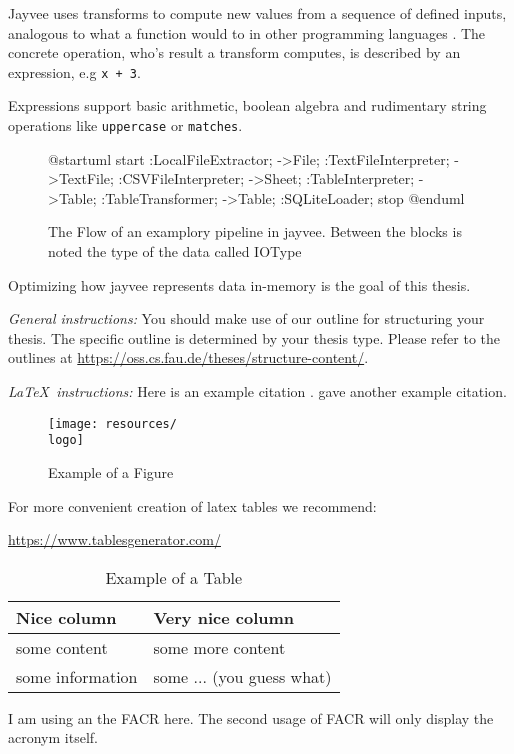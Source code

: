 Jayvee uses transforms to compute new values from a sequence of defined inputs, analogous to what a function would to in other programming languages \autocite{jvalue:jayvee:docs:transfrom}.
The concrete operation, who's result a transform computes, is described by an expression, e.g \Verb|x + 3|.

Expressions support basic arithmetic, boolean algebra and rudimentary string operations like \Verb|uppercase| or \Verb|matches|.

\begin{figure}
	\begin{plantuml}
		@startuml
		start
		:LocalFileExtractor;
		->File;
		:TextFileInterpreter;
		->TextFile;
		:CSVFileInterpreter;
		->Sheet;
		:TableInterpreter;
		->Table;
		:TableTransformer;
		->Table;
		:SQLiteLoader;
		stop
		@enduml
	\end{plantuml}
	\caption{The Flow of an examplory pipeline in jayvee. Between the blocks is noted the type of the data called IOType}
	\label{fig:}
\end{figure}


Optimizing how jayvee represents data in-memory is the goal of this thesis.

\newpage

{\textsl{General instructions:}}
You should make use of our outline for structuring your
thesis. The specific outline is determined by your thesis type.
Please refer to the outlines at
\url{https://oss.cs.fau.de/theses/structure-content/}.

{\textsl{\LaTeX\ instructions:}} Here is an example citation
\autocite{riehle:2011:controlling}.
\textcite{riehle:2007:economic} gave another example citation.

\begin{figure}[ht]
	\texttt{[image: resources/\\logo]}
	\caption{Example of a Figure}
	\label{fig:example}
\end{figure}

For more convenient creation of latex tables we recommend:

\url{https://www.tablesgenerator.com/}

\begin{table}[ht]
	\caption{Example of a Table}
	\label{tab:example}
	\begin{tabular}{|l|l|}
		\hline
		Nice column      & Very nice column          \\
		\hline
		some content     & some more content         \\
		some information & some ... (you guess what) \\
		\hline
	\end{tabular}
\end{table}

I am using an the \ac{FACR} here. The second usage of \ac{FACR} will only display the acronym itself.
